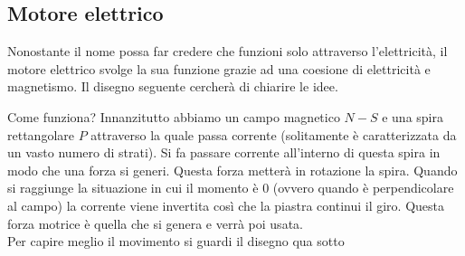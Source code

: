 \subsection{Motore elettrico}
Nonostante il nome possa far credere che funzioni solo attraverso l'elettricità, il motore elettrico 
svolge la sua funzione grazie ad una coesione di elettricità e magnetismo. Il disegno seguente 
cercherà di chiarire le idee.
\begin{center}
\end{center}
Come funziona? Innanzitutto abbiamo un campo magnetico $N-S$ e una spira rettangolare $P$ attraverso 
la quale passa corrente (solitamente è caratterizzata da un vasto numero di strati). Si fa passare 
corrente all'interno di questa spira in modo che una forza si generi. Questa forza metterà in 
rotazione la spira. Quando si raggiunge la situazione in cui il momento è $0$ (ovvero quando è 
perpendicolare al campo) la corrente viene invertita così che la piastra continui il giro. Questa 
forza motrice è quella che si genera e verrà poi usata.\\
Per capire meglio il movimento si guardi il disegno qua sotto
